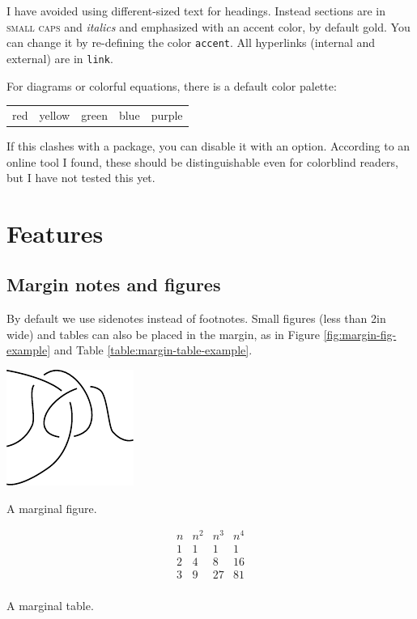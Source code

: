 \documentclass[margincite]{sl2ams}
\begin{document}
I have avoided using different-sized text for headings.
Instead sections are in {\scshape small caps} and {\itshape italics} and emphasized with an {\color{accent} accent} color, by default gold.
You can change it by re-defining the color {\color{accent} \texttt{accent}}.
All hyperlinks (internal and external) are in {\color{link} \texttt{link}}.%

For diagrams or colorful equations, there is a default color palette:
\begin{center}
  \begin{tabular}{ccccc}
    {\color{red} red} 
    &
    {\color{yellow} yellow}
    &
    {\color{green} green}
    &
    {\color{blue} blue} 
    &
    {\color{purple} purple} 
  \end{tabular}
\end{center}
If this clashes with a package, you can disable it with an option.
According to an online tool I found, these should be distinguishable even for colorblind readers, but I have not tested this yet.

\section{Features}

\subsection{Margin notes and figures}
By default we use sidenotes instead of footnotes.
Small figures (less than 2in wide) and tables can also be placed in the margin, as in Figure \ref{fig:margin-fig-example} and Table \ref{table:margin-table-example}.
\begin{marginfigure}
  \centering
  \includegraphics{margin-fig-example.pdf}
  \caption{A marginal figure.}
  \label{fig:margin-fig-example}
\end{marginfigure}
\begin{margintable}
  \[
    \begin{array}{c|ccc}
      n & n^2 & n^3 & n^4\\
      \hline
      1 & 1 & 1 & 1\\
      2 & 4 & 8 & 16 \\
      3 & 9 & 27 & 81 \\
    \end{array}
  \]
  \caption{A marginal table.}
  \label{table:margin-table-example}
\end{margintable}
\end{document}
